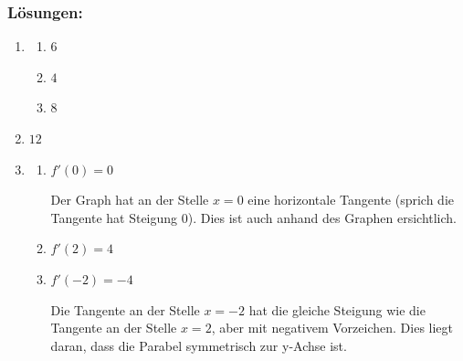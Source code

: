 \clearpage
\subsubsection*{Lösungen:}


\begin{enumerate}
    \item
          \begin{enumerate}
              \item \( 6 \)
              \item \( 4 \)
              \item \( 8 \)
          \end{enumerate}

    \item
          \( 12 \)


    \item
          \begin{enumerate}
              \item \( f'(0) = 0 \)

                    Der Graph hat an der Stelle \( x=0 \) eine horizontale Tangente (sprich die Tangente hat Steigung $0$). Dies ist auch anhand des Graphen ersichtlich.
              \item \( f'(2) = 4 \)
              \item  \( f'(-2) = -4 \)

                    Die Tangente an der Stelle \( x=-2 \) hat die gleiche Steigung wie die Tangente an der Stelle \( x=2 \), aber mit negativem Vorzeichen. Dies liegt daran, dass die Parabel symmetrisch zur y-Achse ist.
          \end{enumerate}


\end{enumerate}
